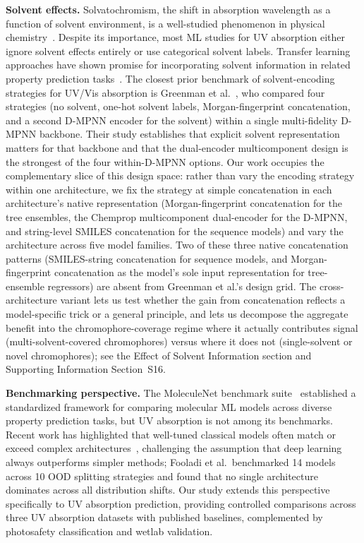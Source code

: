 \documentclass[journal=jcisd8,manuscript=article]{achemso}
\begin{document}
\textbf{Solvent effects.}
Solvatochromism, the shift in absorption wavelength as a function of solvent environment, is a well-studied phenomenon in physical chemistry~\cite{reichardt2011solvents}.
Despite its importance, most ML studies for UV absorption either ignore solvent effects entirely or use categorical solvent labels.
Transfer learning approaches have shown promise for incorporating solvent information in related property prediction tasks~\cite{vermeire2021transfer}. The closest prior benchmark of solvent-encoding strategies for UV/Vis absorption is Greenman et al.~\cite{greenman2022multifidelity}, who compared four strategies (no solvent, one-hot solvent labels, Morgan-fingerprint concatenation, and a second D-MPNN encoder for the solvent) within a single multi-fidelity D-MPNN backbone. Their study establishes that explicit solvent representation matters for that backbone and that the dual-encoder multicomponent design is the strongest of the four within-D-MPNN options. Our work occupies the complementary slice of this design space: rather than vary the encoding strategy within one architecture, we fix the strategy at simple concatenation in each architecture's native representation (Morgan-fingerprint concatenation for the tree ensembles, the Chemprop multicomponent dual-encoder for the D-MPNN, and string-level SMILES concatenation for the sequence models) and vary the architecture across five model families. Two of these three native concatenation patterns (SMILES-string concatenation for sequence models, and Morgan-fingerprint concatenation as the model's sole input representation for tree-ensemble regressors) are absent from Greenman et al.'s design grid. The cross-architecture variant lets us test whether the gain from concatenation reflects a model-specific trick or a general principle, and lets us decompose the aggregate benefit into the chromophore-coverage regime where it actually contributes signal (multi-solvent-covered chromophores) versus where it does not (single-solvent or novel chromophores); see the Effect of Solvent Information section and Supporting Information Section~S16.

\textbf{Benchmarking perspective.}
The MoleculeNet benchmark suite~\cite{wuMoleculeNet2018} established a standardized framework for comparing molecular ML models across diverse property prediction tasks, but UV absorption is not among its benchmarks.
Recent work has highlighted that well-tuned classical models often match or exceed complex architectures~\cite{panapitiya2022evaluation, walters2021applications, fooladi2025evaluating}, challenging the assumption that deep learning always outperforms simpler methods; Fooladi et al.\ benchmarked 14 models across 10 OOD splitting strategies and found that no single architecture dominates across all distribution shifts.
Our study extends this perspective specifically to UV absorption prediction, providing controlled comparisons across three UV absorption datasets with published baselines, complemented by photosafety classification and wetlab validation.
\end{document}
